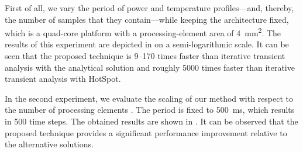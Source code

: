 First of all, we vary the period \period of power and temperature
profiles---and, thereby, the number of samples \ns that they contain---while
keeping the architecture fixed, which is a quad-core platform with a
processing-element area of 4~mm\textsuperscript{2}. The results of this
experiment are depicted in  on a
semi-logarithmic scale. It can be seen that the proposed technique is 9--170
times faster than iterative transient analysis with the analytical solution and
roughly 5000 times faster than iterative transient analysis with HotSpot.

In the second experiment, we evaluate the scaling of our method with respect to
the number of processing elements \np. The period is fixed to 500~ms, which
results in 500 time steps. The obtained results are shown in
. It can be observed that the proposed
technique provides a significant performance improvement relative to the
alternative solutions.

